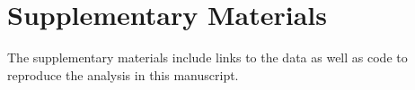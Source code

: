 \documentclass[useAMS,usenatbib,referee]{biom}
\begin{document}
\section*{Supplementary Materials}

The supplementary materials include links to the data as well as code to reproduce the analysis in this manuscript.




\label{lastpage}
\end{document}

